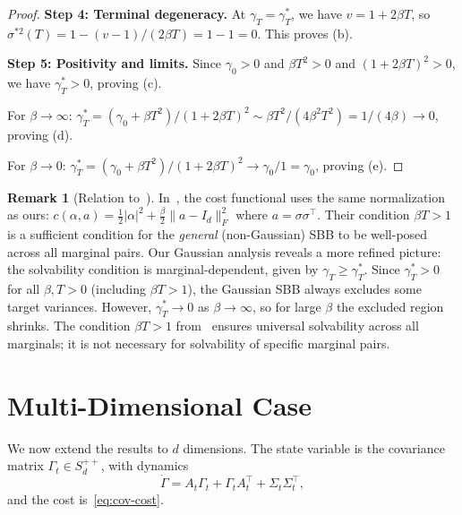 \documentclass[12pt]{article}
\theoremstyle{definition}
\newtheorem{remark}[theorem]{Remark}
\newcommand{\Spp}{S_d^{++}}
\begin{document}
\begin{proof}
\medskip\noindent
\textbf{Step 4: Terminal degeneracy.}
At $\gamma_T = \gamma_T^*$, we have $v = 1 + 2\beta T$, so
$\sigma^{*2}(T) = 1 - (v-1)/(2\beta T) = 1 - 1 = 0$.
This proves (b).

\medskip\noindent
\textbf{Step 5: Positivity and limits.}
Since $\gamma_0 > 0$ and $\beta T^2 > 0$ and $(1 + 2\beta T)^2 > 0$,
we have $\gamma_T^* > 0$, proving (c).

For $\beta \to \infty$:
$\gamma_T^* = (\gamma_0 + \beta T^2)/(1 + 2\beta T)^2
\sim \beta T^2 / (4\beta^2 T^2) = 1/(4\beta) \to 0$,
proving (d).

For $\beta \to 0$:
$\gamma_T^* = (\gamma_0 + \beta T^2)/(1 + 2\beta T)^2
\to \gamma_0/1 = \gamma_0$,
proving (e).
\end{proof}

\begin{remark}[Relation to~\cite{HLMPT26}]\label{rem:hlmpt}
In~\cite{HLMPT26}, the cost functional uses the same normalization as
ours: $c(\alpha, a) = \frac{1}{2}|\alpha|^2 +
\frac{\beta}{2}\|a - I_d\|_F^2$ where $a = \sigma\sigma^\top$.
Their condition $\beta T > 1$ is a sufficient condition for the
\emph{general} (non-Gaussian) SBB to be well-posed across all marginal
pairs.
Our Gaussian analysis reveals a more refined picture:
the solvability condition is marginal-dependent, given by
$\gamma_T \ge \gamma_T^*$.
Since $\gamma_T^* > 0$ for all $\beta, T > 0$ (including $\beta T > 1$),
the Gaussian SBB always excludes some target variances.
However, $\gamma_T^* \to 0$ as $\beta \to \infty$, so for large $\beta$
the excluded region shrinks.
The condition $\beta T > 1$ from~\cite{HLMPT26} ensures universal
solvability across all marginals; it is not necessary for solvability
of specific marginal pairs.
\end{remark}

\section{Multi-Dimensional Case}\label{sec:multid}

We now extend the results to $d$ dimensions.
The state variable is the covariance matrix
$\Gamma_t \in \Spp$, with dynamics
\[
\dot\Gamma = A_t \Gamma_t + \Gamma_t A_t^\top + \Sigma_t \Sigma_t^\top,
\]
and the cost is~\eqref{eq:cov-cost}.
\end{document}
